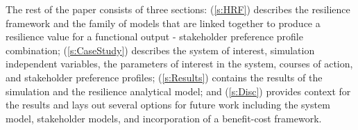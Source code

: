 \documentclass[preprint,12pt]{elsarticle}
\begin{document}

The rest of the paper consists of three sections: 
(\ref{s:HRF}) describes the
resilience framework and the family of models that are linked
together to produce a resilience value for a functional output -
stakeholder preference profile combination; (\ref{s:CaseStudy})
% 
% 
describes the system of interest, simulation independent variables, the parameters of
interest in the system, courses of action, and stakeholder preference
profiles; (\ref{s:Results}) contains the results of the 
simulation and the resilience analytical model; and (\ref{s:Disc})
provides context for the results and lays out several options for
future work including the system model, stakeholder
models, and incorporation of a benefit-cost framework. 





\end{document}
